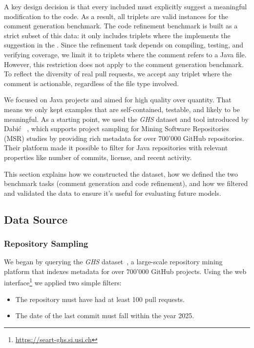 A key design decision is that every included \revComment must explicitly suggest a meaningful
modification to the code. As a result, all triplets are valid instances for the comment generation
benchmark. The code refinement benchmark is built as a strict subset of this data: it only includes
triplets where the \revCode implements the suggestion in the \revComment. Since the refinement task
depends on compiling, testing, and verifying coverage, we limit it to triplets where the comment
refers to a Java file. However, this restriction does not apply to the comment generation benchmark.
To reflect the diversity of real pull requests, we accept any triplet where the comment is
actionable, regardless of the file type involved.

We focused on Java projects and aimed for high quality over quantity. That means we only kept
examples that are self-contained, testable, and likely to be meaningful. As a starting point, we
used the \textit{GHS} dataset and tool introduced by Dabić \etal~\cite{Dabic:msr2021data}, which
supports project sampling for Mining Software Repositories (MSR) studies by providing rich metadata
for over 700'000 GitHub repositories. Their platform made it possible to filter for Java
repositories with relevant properties like number of commits, license, and recent activity.

This section explains how we constructed the dataset, how we defined the two benchmark tasks
(comment generation and code refinement), and how we filtered and validated the data to ensure it’s
useful for evaluating future models.


\subsection{Data Source}

\subsubsection{Repository Sampling}

We began by querying the \textit{GHS} dataset~\cite{Dabic:msr2021data}, a large-scale repository
mining platform that indexes metadata for over 700'000 GitHub projects. Using the web
interface\footnote{\url{https://seart-ghs.si.usi.ch}} we applied two simple filters:

\begin{itemize}
	\item The repository must have had at least 100 pull requests.
	\item The date of the last commit must fall within the year 2025.
\end{itemize}


